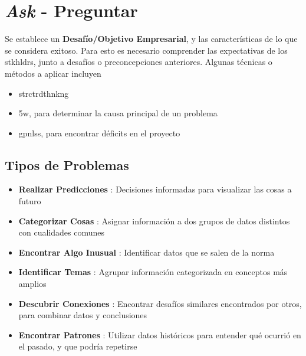 
\section{\textit{Ask} - Preguntar}
Se establece un \textbf{Desafío/Objetivo Empresarial}, y las características de lo que se considera exitoso. Para esto es necesario comprender las expectativas de los \gls{stkhldrs}, junto a desafíos o preconcepciones anteriores. Algunas técnicas o métodos a aplicar incluyen
\begin{itemize}
    \item {\gls{strctrdthnkng}}
    \item {\gls{5w}, para determinar la causa principal de un problema}
    \item {\gls{gpnlss}, para encontrar déficits en el proyecto}
\end{itemize}

\subsection{Tipos de Problemas}
\begin{itemize}
    \item {\textbf{Realizar Predicciones} : Decisiones informadas para visualizar las cosas a futuro}
    \item {\textbf{Categorizar Cosas} : Asignar información a dos grupos de datos distintos con cualidades comunes}
    \item {\textbf{Encontrar Algo Inusual} : Identificar datos que se salen de la norma}
    \item {\textbf{Identificar Temas} : Agrupar información categorizada en conceptos más amplios}
    \item {\textbf{Descubrir Conexiones} : Encontrar desafíos similares encontrados por otros, para combinar datos y conclusiones}
    \item {\textbf{Encontrar Patrones} : Utilizar datos históricos para entender qué ocurrió en el pasado, y que podría repetirse}
\end{itemize}


